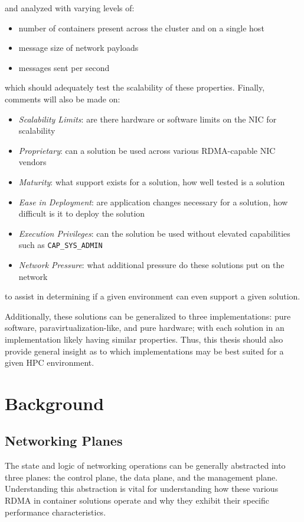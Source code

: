 \documentclass[12pt,titlepage]{article}
\begin{document}
\noindent
and analyzed with varying levels of:
\begin{itemize}[nolistsep]
	\item number of containers present across the cluster and on a single host
	\item message size of network payloads
	\item messages sent per second
\end{itemize}
which should adequately test the scalability of these properties.
Finally, comments will also be made on:
\begin{itemize}[nolistsep]
	\item \textit{Scalability Limits}: are there hardware or software limits on the NIC for scalability
	\item \textit{Proprietary}: can a solution be used across various RDMA-capable NIC vendors
	\item \textit{Maturity}: what support exists for a solution, how well tested is a solution
	\item \textit{Ease in Deployment}: are application changes necessary for a solution, how difficult is it to deploy the solution
	\item \textit{Execution Privileges}: can the solution be used without elevated capabilities such as \texttt{CAP\_SYS\_ADMIN}
	\item \textit{Network Pressure}: what additional pressure do these solutions put on the network
\end{itemize}
to assist in determining if a given environment can even support a given solution.

Additionally, these solutions can be generalized to three implementations: pure software, paravirtualization-like, and pure hardware;
with each solution in an implementation likely having similar properties.
Thus, this thesis should also provide general insight as to which implementations may be best suited for a given HPC environment.


\section{Background}
\subsection{Networking Planes}\label{subsec:Networking Planes}
The state and logic of networking operations can be generally abstracted into three planes: the control plane, the data plane, and the management plane.
Understanding this abstraction is vital for understanding how these various RDMA in container solutions operate and why they exhibit their specific performance characteristics.
\end{document}

